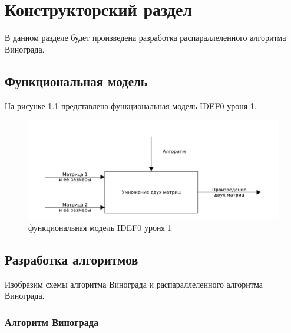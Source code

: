 \chapter{Конструкторский раздел}
\label{cha:design}

В данном разделе будет произведена разработка распараллеленного алгоритма Винограда.

\section{Функциональная модель}
На рисунке \ref{img:idef0} представлена функциональная модель IDEF0 уроня 1.
\begin{figure}
    \centering
    \includegraphics[scale=.7]{pdf/mainIdef0.pdf}
    \caption{функциональная модель IDEF0 уроня 1}
    \label{img:idef0}
\end{figure}

\section{Разработка алгоритмов}
Изобразим схемы алгоритма Винограда и распараллеленного алгоритма Винограда.

\subsection{Алгоритм Винограда}

